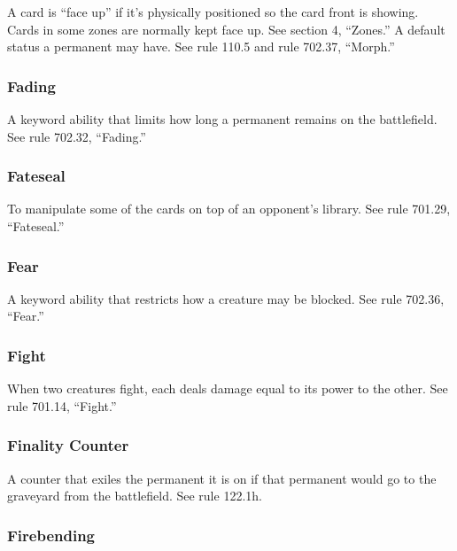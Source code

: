 {{{{{{{{{A card is “face up” if it’s physically positioned so the card front is showing. Cards in some zones are normally kept face up. See section 4, “Zones.”
A default status a permanent may have. See rule 110.5 and rule 702.37, “Morph.”

\subsubsection*{Fading}

A keyword ability that limits how long a permanent remains on the battlefield. See rule 702.32, “Fading.”

\subsubsection*{Fateseal}

To manipulate some of the cards on top of an opponent’s library. See rule 701.29, “Fateseal.”

\subsubsection*{Fear}

A keyword ability that restricts how a creature may be blocked. See rule 702.36, “Fear.”

\subsubsection*{Fight}

When two creatures fight, each deals damage equal to its power to the other. See rule 701.14, “Fight.”

\subsubsection*{Finality Counter}

A counter that exiles the permanent it is on if that permanent would go to the graveyard from the battlefield. See rule 122.1h.

\subsubsection*{Firebending}

}}}}}}}}}
